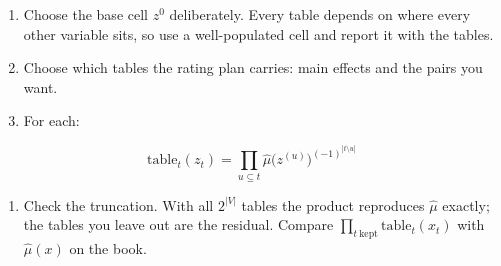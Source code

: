 \documentclass[
  letterpaper,
  DIV=11,
  numbers=noendperiod]{scrartcl}
\providecommand{\tightlist}{%
  \setlength{\itemsep}{0pt}\setlength{\parskip}{0pt}}
\begin{document}
\begin{enumerate}
\def\labelenumi{\arabic{enumi}.}
\tightlist
\item
  Choose the base cell \(z^0\) deliberately. Every table depends on
  where every other variable sits, so use a well-populated cell and
  report it with the tables.
\item
  Choose which tables the rating plan carries: main effects and the
  pairs you want.
\item
  For each:
\end{enumerate}

\[
\text{table}_t(z_t) = \prod_{u \subseteq t} \hat{\mu}\big(z^{(u)}\big)^{(-1)^{|t \setminus u|}}
\]

\begin{enumerate}
\def\labelenumi{\arabic{enumi}.}
\setcounter{enumi}{3}
\tightlist
\item
  Check the truncation. With all \(2^{|V|}\) tables the product
  reproduces \(\hat{\mu}\) exactly; the tables you leave out are the
  residual. Compare \(\prod_{t\ \text{kept}} \text{table}_t(x_t)\) with
  \(\hat{\mu}(x)\) on the book.
\end{enumerate}
\end{document}
